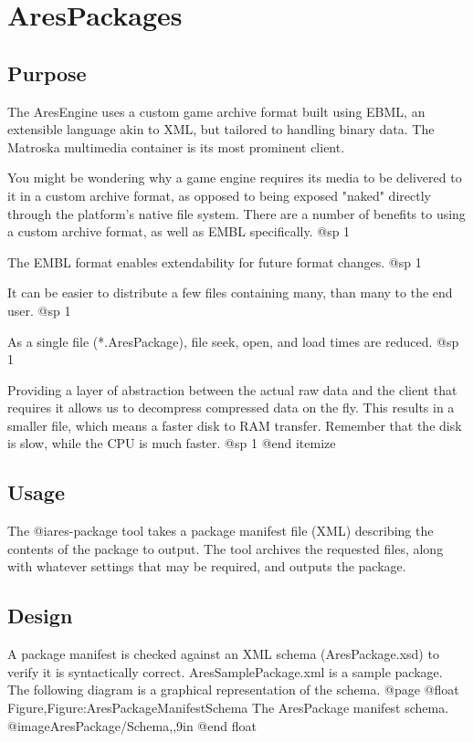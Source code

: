 \section{AresPackages}

\subsection{Purpose}

The AresEngine uses a custom game archive format built using EBML, an extensible language akin to XML, but tailored to handling binary data. The Matroska multimedia container is its most prominent client.

You might be wondering why a game engine requires its media to be delivered to it in a custom archive format, as opposed to being exposed "naked" directly through the platform's native file system. There are a number of benefits to using a custom archive format, as well as EMBL specifically.
@sp 1

\itemize
\item
The EMBL format enables extendability for future format changes.
@sp 1

\item
It can be easier to distribute a few files containing many, than many to the end user.
@sp 1

\item
As a single file (*.AresPackage), file seek, open, and load times are reduced.
@sp 1

\item
Providing a layer of abstraction between the actual raw data and the client that requires it allows us to decompress compressed data on the fly. This results in a smaller file, which means a faster disk to RAM transfer. Remember that the disk is slow, while the CPU is much faster.
@sp 1
@end itemize

\subsection{Usage}
The @i{ares-package} tool takes a package manifest file (XML) describing the contents of the package to output. The tool archives the requested files, along with whatever settings that may be required, and outputs the package.

\subsection{Design}
A package manifest is checked against an XML schema (AresPackage.xsd) to verify it is syntactically correct. AresSamplePackage.xml is a sample package. The following diagram is a graphical representation of the schema.
@page
@float Figure,Figure:AresPackageManifestSchema
The AresPackage manifest schema.
@image{AresPackage/Schema,,9in}
@end float

